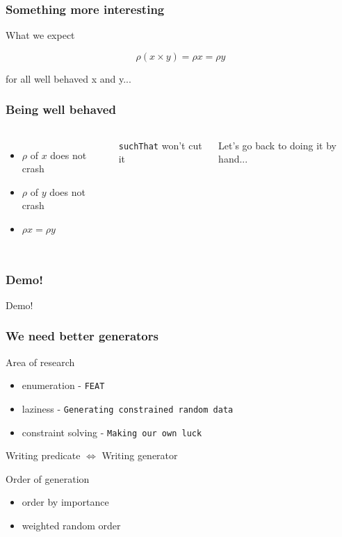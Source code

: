 \documentclass{beamer}
\begin{document}
\begin{frame}
    \frametitle{Something more interesting}
        \centerline{What we expect}
        \begin{equation*}
            \rho (x \times y) = \rho x = \rho y
        \end{equation*}
        \centerline{}
        \centerline{for all well behaved x and y...}
\end{frame}

\begin{frame}
    \frametitle{Being well behaved}
        \begin{columns}
                \begin{itemize}
                    \item $\rho$ of $x$ does not crash
                    \item $\rho$ of $y$ does not crash
                    \item $\rho x = \rho y$
                \end{itemize}
                \pause
                \centerline{\texttt{suchThat} won't cut it}
                \centerline{}
                \centerline{Let's go back to doing it by hand...}
        \end{columns}
\end{frame}

\begin{frame}
    \frametitle{Demo!}
        \Huge{\centerline{Demo!}}
\end{frame}

\begin{frame}
    \frametitle{We need better generators}
        Area of research
        \begin{itemize}
            \item enumeration - \texttt{FEAT}
            \item laziness - \texttt{Generating constrained random data}
            \item constraint solving - \texttt{Making our own luck}
        \end{itemize}
        Writing predicate $\iff$ Writing generator\\
        \centerline{}
        Order of generation
        \begin{itemize}
            \item order by importance
            \item weighted random order
        \end{itemize}
\end{frame}
\end{document}
